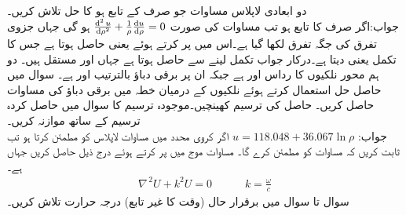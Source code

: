 دو ابعادی لاپلاس مساوات جو صرف  کے تابع ہو کا حل تلاش کریں۔\\
جواب:\quad اگر  صرف  کا تابع ہو تب مساوات  کی صورت
$\frac{\dif^{\,2}u}{\dif \rho^2}+\frac{1}{\rho}\frac{\dif u}{\dif \rho}=0$
ہو گی جہاں جزوی تفرق کی جگہ تفرق لکھا گیا ہے۔اس میں  پر کرتے ہوئے  یعنی  حاصل ہوتا ہے جس کا  تکمل  یعنی 
 دیتا ہے۔درکار جواب تکمل لینے سے  حاصل ہوتا ہے جہاں  اور  مستقل ہیں۔
\quad 
دو ہم محور نلکیوں کا رداس  اور  ہے جبکہ ان پر برقی دباؤ بالترتیب
  اور  ہے۔ سوال  میں حاصل حل استعمال کرتے ہوئے نلکیوں کے درمیان خطہ میں برقی دباؤ کی مساوات حاصل کریں۔ حاصل  کی ترسیم کھینچیں۔موجودہ ترسیم کا سوال  میں حاصل کردہ ترسیم کے ساتھ موازنہ کریں۔\\
جواب:\quad
$u=118.048+36.067\ln \rho$
\quad
اگر کروی محدد میں  مساوات لاپلاس  کو مطمئن کرتا ہو تب ثابت کریں کہ  مساوات  کو مطمئن کرے گا۔
\quad
مساوات موج  میں  پر کرتے ہوئے درج ذیل  حاصل کریں جہاں  ہے۔
\begin{align*}
\nabla^{\,2}U+k^2U=0\quad \quad \quad k=\frac{\omega}{c}
\end{align*}
سوال  تا سوال  میں برقرار حال (وقت کا غیر تابع) درجہ حرارت  تلاش کریں۔

